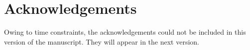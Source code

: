 \chapter*{Acknowledgements}
\label{chap:acknowledgements}

Owing to time constraints, the acknowledgements could not be included in this version of the manuscript.
They will appear in the next version.
